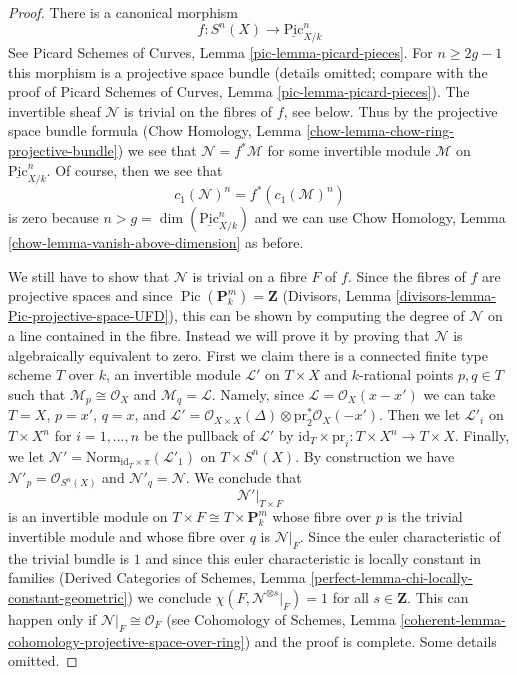 \documentclass{stacks-project}
\theoremstyle{plain}
\theoremstyle{definition}
\theoremstyle{remark}
\numberwithin{equation}{subsection}
\def\Pic{\mathop{\mathrm{Pic}}\nolimits}
\def\Picardfunctor{\mathrm{Pic}}
\begin{document}
\begin{proof}
\medskip\noindent
There is a canonical morphism
$$
f : S^n(X) \longrightarrow \underline{\Picardfunctor}^n_{X/k}
$$
See Picard Schemes of Curves, Lemma \ref{pic-lemma-picard-pieces}.
For $n \geq 2g - 1$ this morphism is a projective space bundle
(details omitted; compare with the
proof of Picard Schemes of Curves, Lemma \ref{pic-lemma-picard-pieces}).
The invertible sheaf $\mathcal{N}$ is trivial on the
fibres of $f$, see below. Thus by the projective space bundle formula
(Chow Homology, Lemma \ref{chow-lemma-chow-ring-projective-bundle})
we see that $\mathcal{N} = f^*\mathcal{M}$ for some invertible
module $\mathcal{M}$ on $\underline{\Picardfunctor}^n_{X/k}$.
Of course, then we see that
$$
c_1(\mathcal{N})^n = f^*(c_1(\mathcal{M})^n)
$$
is zero because $n > g = \dim(\underline{\Picardfunctor}^n_{X/k})$
and we can use Chow Homology, Lemma \ref{chow-lemma-vanish-above-dimension}
as before.

\medskip\noindent
We still have to show that $\mathcal{N}$ is trivial on a fibre $F$
of $f$. Since the fibres of $f$ are projective spaces and since
$\Pic(\mathbf{P}^m_k) = \mathbf{Z}$
(Divisors, Lemma \ref{divisors-lemma-Pic-projective-space-UFD}),
this can be shown by computing the degree of $\mathcal{N}$
on a line contained in the fibre. Instead we will prove it by
proving that $\mathcal{N}$ is algebraically
equivalent to zero. First we claim there is a connected finite type scheme $T$
over $k$, an invertible module $\mathcal{L}'$ on $T \times X$ and
$k$-rational points $p, q \in T$ such that
$\mathcal{M}_p \cong \mathcal{O}_X$ and $\mathcal{M}_q = \mathcal{L}$.
Namely, since $\mathcal{L} = \mathcal{O}_X(x - x')$ we can take
$T = X$, $p = x'$, $q = x$, and
$\mathcal{L}' = \mathcal{O}_{X \times X}(\Delta)
\otimes \text{pr}_2^*\mathcal{O}_X(-x')$.
Then we let $\mathcal{L}'_i$ on
$T \times X^n$ for $i = 1, \ldots, n$
be the pullback of $\mathcal{L}'$ by
$\text{id}_T \times \text{pr}_i : T \times X^n \to T \times X$.
Finally, we let
$\mathcal{N}' = \text{Norm}_{\text{id}_T \times \pi}(\mathcal{L}'_1)$
on $T \times S^n(X)$.
By construction we have $\mathcal{N}'_p = \mathcal{O}_{S^n(X)}$
and $\mathcal{N}'_q = \mathcal{N}$.
We conclude that
$$
\mathcal{N}'|_{T \times F}
$$
is an invertible module on $T \times F \cong T \times \mathbf{P}^m_k$
whose fibre over $p$ is the trivial invertible module and whose fibre
over $q$ is $\mathcal{N}|_F$. Since the euler characteristic
of the trivial bundle is $1$ and since this euler characteristic
is locally constant in families (Derived Categories of Schemes,
Lemma \ref{perfect-lemma-chi-locally-constant-geometric})
we conclude $\chi(F, \mathcal{N}^{\otimes s}|_F) = 1$
for all $s \in \mathbf{Z}$. This can happen only if
$\mathcal{N}|_F \cong \mathcal{O}_F$ (see
Cohomology of Schemes, Lemma
\ref{coherent-lemma-cohomology-projective-space-over-ring})
and the proof is complete. Some details omitted.
\end{proof}
\end{document}
